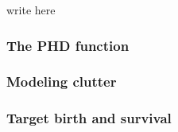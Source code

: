 write here

\subsubsection{The PHD function}

\subsubsection{Modeling clutter}

\subsubsection{Target birth and survival}



